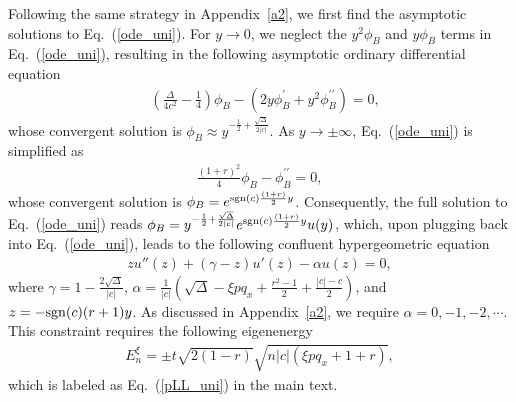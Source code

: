 \documentclass[aps, twocolumn, floatfix, superscriptaddress, prb]{revtex4-1}
\begin{document}
Following the same strategy in Appendix~\ref{a2}, we first find the asymptotic solutions to Eq.~(\ref{ode_uni}). For $y\rightarrow0$, we neglect the $y^2\phi_B$ and $y\phi_B$ terms in Eq.~(\ref{ode_uni}), resulting in the following asymptotic ordinary differential equation
%
\begin{align}
&\left(\frac{\Delta}{4c^2}-\frac{1}{4}\right)\phi_B - \left(2 y\phi^\prime_B+y^2 \phi_B^{\prime\prime}\right)=0,
\end{align}
%
whose convergent solution is $\phi_B\approx y^{-\frac12+\frac{\sqrt{\Delta}}{2|c|}}$. As {$y\rightarrow\pm\infty$}, Eq.~(\ref{ode_uni}) is simplified as
%
\begin{align}
{
\frac{(1+r)^2}{4} \phi_B-  \phi_B^{\prime\prime}=0,
}
\end{align}
%
whose convergent solution is $\phi_B=e^{{\rm sgn}(c)\frac{(1+r)}{2}y}$. Consequently, the full solution to Eq.~(\ref{ode_uni}) reads $\phi_B=y^{-\frac12+\frac{\sqrt{\Delta}}{2|c|}}e^{{\rm sgn}(c)\frac{(1+r)}{2}y}u(y)$, which, upon plugging back into Eq.~(\ref{ode_uni}), leads to the following confluent hypergeometric equation
%
\begin{align}
zu''(z)+(\gamma-z)u'(z)-\alpha u(z)=0,
\end{align}
where $\gamma=1-\frac{2\sqrt\Delta}{|c|}$, $\alpha=\frac{1}{|c|}(\sqrt{\Delta}-\xi p q_x  +\frac{r^2-1}{2}+\frac{|c|-c}{2})$, and $z=-{\rm sgn}(c)(r+1)y$. As discussed in Appendix~\ref{a2}, we require $\alpha=0,-1,-2,\cdots$. This constraint requires the following eigenenergy
%
\begin{align}
{
E_n^\xi=\pm t\sqrt{2(1-r)}\sqrt{n|c|\left(\xi p q_x+1+r\right)},
}
\end{align}
%
which is labeled as Eq.~(\ref{pLL_uni}) in the main text.
\end{document}
